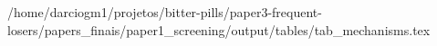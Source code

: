 /home/darciogm1/projetos/bitter-pills/paper3-frequent-losers/papers_finais/paper1_screening/output/tables/tab_mechanisms.tex